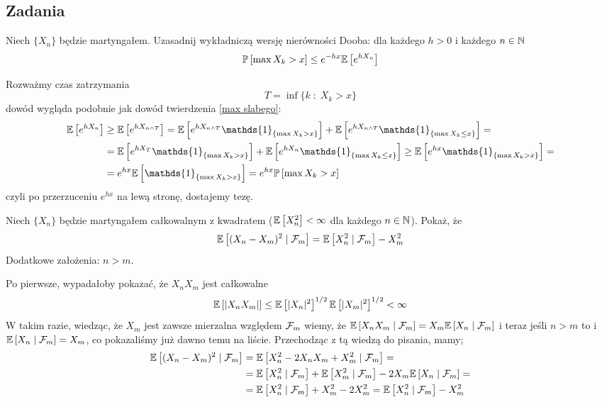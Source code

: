 \subsection{Zadania}

\setcounter{problem}{0}

\begin{problem}
  Niech $\{X_n\}$ będzie martyngałem. Uzasadnij wykładniczą wersję nierówności Dooba: dla każdego $h>0$ i każdego $n\in\operatorname{\mathbb{N}}$
  $$\prob{\max X_k>x}\leq e^{-hx}\expected{e^{hX_n}}$$
\end{problem}

\begin{solution}
  Rozważmy czas zatrzymania
  $$T=\inf\{k\;:\;X_k>x\}$$
  dowód wygląda podobnie jak dowód twierdzenia \ref{max slabego}:
  \begin{align*}
    \expected{e^{hX_n}}&\geq \expected{e^{hX_{n\land T}}}=\expected{e^{hX_{n\land T}}\mathds{1}_{\{\max X_k >x\}}} + \expected{e^{hX_{n\land T}}\mathds{1}_{\{\max X_k\leq x\}}}= \\ 
    &= \expected{e^{hX_T}\mathds{1}_{\{\max X_k>x\}}}+\expected{e^{hX_n}\mathds{1}_{\{\max X_k\leq x\}}}\geq \expected{e^{hx}\mathds{1}_{\{\max X_k>x\}}}=\\ 
    &=e^{hx}\expected{\mathds{1}_{\{\max X_k>x\}}}=e^{hx}\prob{\max X_k>x}
  \end{align*}
  czyli po przerzuceniu $e^{hx}$ na lewą stronę, dostajemy tezę.
\end{solution}

\begin{problem}
  Niech $\{X_n\}$ będzie martyngałem całkowalnym z kwadratem ($\expected{X_n^2}<\infty$ dla każdego $n\in\operatorname{\mathbb{N}}$). Pokaż, że
  $$\expected{(X_n-X_m)^2}{\set{F}_m}=\expected{X_n^2}{\set{F}_m}-X_m^2$$
  {\color{red}Dodatkowe założenia: $n>m$.}
\end{problem}

\begin{solution}
  Po pierwsze, wypadałoby pokazać, że $X_nX_m$ jest całkowalne
  $$\expected{|X_nX_m|}\leq\expected{|X_n|^2}^{1/2}\expected{|X_m|^2}^{1/2}<\infty$$
  W takim razie, wiedząc, że $X_m$ jest zawsze mierzalna względem $\mathcal{F}_m$ wiemy, że $\expected{X_nX_m}{\set{F}_m}=X_m\expected{X_n}{\set{F}_m}$ i teraz jeśli $n>m$ to i $\expected{X_n}{\set{F}_m}=X_m$, co pokazaliśmy już dawno temu na liście. Przechodząc z tą wiedzą do pisania, mamy;
  \begin{align*}
    \expected{(X_n-X_m)^2}{\set{F}_m}&=\expected{X_n^2-2X_nX_m+X_m^2}{\set{F}_m}=\\ 
                                     &=\expected{X_n^2}{\set{F}_m}+\expected{X_m^2}{\set{F}_m}-2X_m\expected{X_n}{\set{F}_m}=\\ 
                                     &=\expected{X_n^2}{\set{F}_m}+X_m^2-2X_m^2=\expected{X_n^2}{\set{F}_m}-X_m^2
  \end{align*}
\end{solution}

